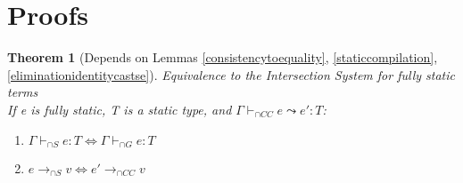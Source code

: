 \documentclass[a4paper]{article}
\newtheorem{theorem}{Theorem}
\begin{document}
\section{Proofs}
\begin{theorem}[Depends on Lemmas \ref{consistencytoequality}, \ref{staticcompilation}, \ref{eliminationidentitycastse}]
\label{theorem1}
Equivalence to the Intersection System for fully static terms\\
If e is fully static, T is a static type, and $\Gamma \vdash_{\cap CC} e \leadsto e' : T$:
\begin{enumerate}
    \item $\Gamma \vdash_{\cap S} e : T \iff \Gamma \vdash_{\cap G} e : T$
    \item $e \longrightarrow_{\cap S} v \iff e' \longrightarrow_{\cap CC} v$
\end{enumerate}
\end{theorem}
\end{document}
